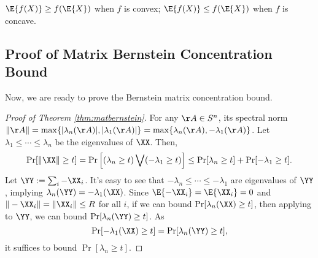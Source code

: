 \begin{lemma}
  \label{lem:Jensen}
  $\E{f(X)} \geq f(\E{X})$ when $f$ is convex;
  $\E{f(X)} \leq f(\E{X})$ when $f$ is concave.
\end{lemma}

\subsection{Proof of Matrix Bernstein Concentration Bound}
Now, we are ready to prove the Bernstein matrix concentration bound.
\begin{proof}[Proof of Theorem \ref{thm:matbernstein}]
  For any $\AA\in S^n$, its spectral norm $\|\AA\| = \max\{|\lambda_n(\AA)|,|\lambda_1(\AA)|\} = \max\{\lambda_n(\AA),-\lambda_1(\AA)\}$.
  Let $\lambda_1\leq\cdots\leq\lambda_n$ be the eigenvalues of $\XX$. Then,
  \[\Pr[\|\XX\|\geq t] = \Pr\left[(\lambda_n \geq t) \bigvee (-\lambda_1 \geq t)\right] \leq \Pr[\lambda_n \geq t]+\Pr[-\lambda_1 \geq t]. \]
  Let $\YY:=\sum_i -\XX_i$. It's easy to see that $-\lambda_n\leq\cdots\leq-\lambda_1$ are eigenvalues of $\YY$, implying $\lambda_n(\YY)=-\lambda_1(\XX)$.
  Since $\E{-\XX_i} = \E{\XX_i} = 0$ and $\|-\XX_i\|=\|\XX_i\|\leq R$ for all $i$, if we can bound $\Pr[\lambda_n(\XX)\geq t]$, then applying to $\YY$, we can bound $\Pr[\lambda_n(\YY)\geq t]$.
  As
  \[ \Pr[-\lambda_1(\XX)\geq t] = \Pr[\lambda_n(\YY)\geq t], \]
  it suffices to bound $\Pr[\lambda_n \geq t]$.


\end{proof}

